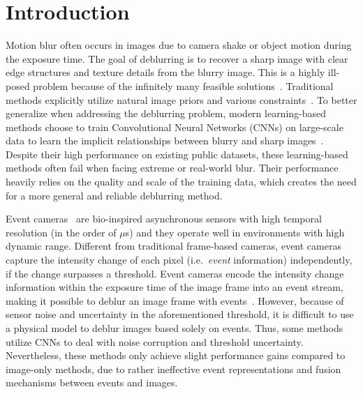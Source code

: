 \documentclass[runningheads]{llncs}
\newlength \g
\begin{document}
\section{Introduction}
\label{sec:intro}

Motion blur often occurs in images due to camera shake or object motion during the exposure time. The goal of deblurring is to recover a sharp image with clear edge structures and texture details from the blurry image. This is a highly ill-posed problem because of the infinitely many feasible solutions~\cite{bahat2017non,cho2009fast,zhang2017beyond}. Traditional methods explicitly utilize natural image priors and various constraints~\cite{bahat2017non,fergus2006removing,kotera2013blind,krishnan2011blind,levin2009understanding,levin2011efficient,xu2013unnatural}. To better generalize when addressing the deblurring problem, modern learning-based methods choose to train Convolutional Neural Networks (CNNs) on large-scale data to learn the implicit relationships between blurry and sharp images~\cite{gong2017motion,nah2017deep,sun2015learning,tao2018scale,zhang2018dynamic}. Despite their high performance on existing public datasets, these learning-based methods often fail when facing extreme or real-world blur. Their performance heavily relies on the quality and scale of the training data, which creates the need for a more general and reliable deblurring method.


Event cameras~\cite{brandli2014240,gallego2020event,patrick2008128x} are bio-inspired asynchronous sensors with high temporal resolution (in the order of $\mu$s) and they operate well in environments with high dynamic range. Different from traditional frame-based cameras, event cameras capture the intensity change of each pixel (i.e.\ \emph{event} information) independently, if the change surpasses a threshold. Event cameras encode the intensity change information within the exposure time of the image frame into an event stream, making it possible to deblur an image frame with events~\cite{pan2019bringing_high_framerate}. However, because of sensor noise and uncertainty in the aforementioned threshold, it is difficult to use a physical model to deblur images based solely on events. Thus, some methods~\cite{jiang2020learning_event_motion_deblur,lin2020learning_event_video_deblur,shang2021bringing} utilize CNNs to deal with noise corruption and threshold uncertainty. Nevertheless, these methods only achieve slight performance gains compared to image-only methods, due to rather ineffective event representations and fusion mechanisms between events and images.
\end{document}
